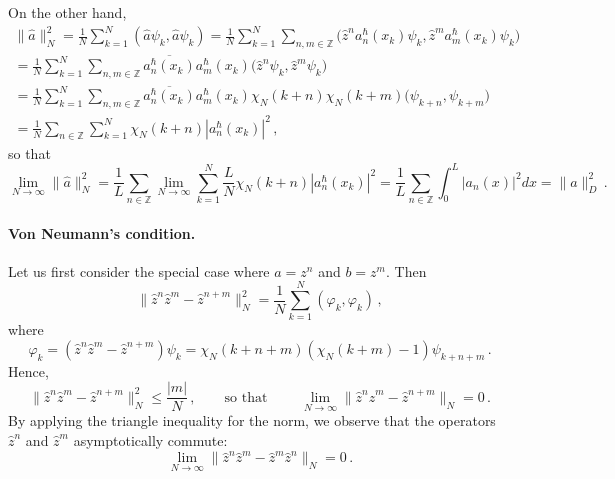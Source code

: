 \documentclass[12pt,a4paper]{article}
\numberwithin{equation}{section}
\theoremstyle{theorem}
\theoremstyle{remark}
\begin{document}
On the other hand, 
             \begin{equation}
             \begin{array}{c}
              \displaystyle   \|\hat{a}\|^2_N=\frac1{N}\sum_{k=1}^N (\hat a\psi_k,  \hat a\psi_k)=  
                 \frac1{N}\sum_{k=1}^N\sum_{n,m\in\mathbb{Z}} \big(\hat{z}^na^\hbar_n(x_k)\psi_k,  \hat{z}^ma^\hbar_m(x_k)\psi_k\big) \\[7mm]               
 \displaystyle  =\frac1{N}\sum_{k=1}^N\sum_{n,m\in\mathbb{Z}}\overline {a^\hbar_n(x_k)}a^\hbar_m(x_k)\big(\hat{z}^n\psi_k,  \hat{z}^m\psi_k\big) \\[7mm]
 \displaystyle  =\frac1{N}\sum_{k=1}^N\sum_{n,m\in\mathbb{Z}}\overline{ a^\hbar_n(x_k)}a^\hbar_m(x_k)\chi_N(k+n)\chi_N(k+m)\big(\psi_{k+n},  \psi_{k+m}\big)\\[7mm]
 \displaystyle =\frac1{N}\sum_{n\in\mathbb{Z}}\sum_{k=1}^{N} \chi_N(k+n)|a^\hbar_n(x_k)|^2  \,,                   
 \end{array}
                   \end{equation}
so that 
     \begin{equation}
  \lim_{N\to \infty}\|\hat{a}\|^2_N=\frac1{L}\sum_{n\in\mathbb{Z}}\lim_{N\rightarrow \infty}\sum_{k=1}^{N}\frac{L}{N}\chi_N(k+n)|a^\hbar_n(x_k)|^2 
    =\frac1{L}\sum_{n\in\mathbb{Z}}\int_0^L|a_n(x)|^2 dx =\|a\|_D^2\,.  \end{equation}       

\paragraph{Von Neumann's condition.} 
Let us first consider the special case where $a=z^n$ and $b=z^m$. Then
  \begin{equation}
      \|\hat z^n \hat{z}^m-\widehat{z}^{n+m}\|^2_N=\frac{1}{N}\sum_{k=1}^N (\varphi_k,\varphi_k)\,,
  \end{equation}
  where 
  \begin{equation}
      \varphi_k=(\hat z^n \hat{z}^m-\widehat{z}^{n+m})\psi_k=\chi_N(k+n+m)(\chi_N(k+m)-1)\psi_{k+n+m}\,.
      \end{equation}
 Hence,
       \begin{equation}\label{zzz}
      \|\hat z^n \hat{z}^m-\widehat{z}^{n+m}\|^2_N\leq \frac{|m|}{N}\,,\qquad \mbox{so that }\qquad \lim_{N\rightarrow\infty}\|\hat z^n \hat{z}^m-\widehat{z}^{n+m}\|_N=0\,. 
  \end{equation}
  By applying the triangle inequality for the norm, we observe that the operators $\hat z^n$ and $\hat z^m$ asymptotically commute:
  \begin{equation}\label{zzN}
      \lim_{N\to\infty}\|\hat z^n\hat z^m-\hat z^m\hat z^n\|_N=0\,.
  \end{equation}
  
\end{document}
